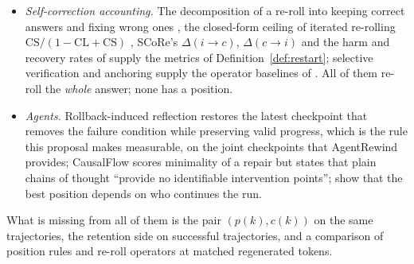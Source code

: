 \begin{itemize}[leftmargin=1.1em]
\item \emph{Self-correction accounting.} The decomposition of a re-roll into keeping correct answers and fixing wrong ones \cite{yang2024confcrit,huang2024cannot,kamoi2024survey}, the closed-form ceiling of iterated re-rolling $\mathrm{CS}/(1-\mathrm{CL}+\mathrm{CS})$ \cite{yang2025scaling}, SCoRe's $\Delta(i{\to}c)$, $\Delta(c{\to}i)$ \cite{kumar2025score} and the harm and recovery rates of \citet{zhang2026riskaware} supply the metrics of Definition~\ref{def:restart}; selective verification \cite{dip2026thinkagain} and anchoring \cite{verma2026tryagain} supply the operator baselines of . All of them re-roll the \emph{whole} answer; none has a position.
\item \emph{Agents.} Rollback-induced reflection \cite{yu2026rir} restores the latest checkpoint that removes the failure condition while preserving valid progress, which is the rule this proposal makes measurable, on the joint checkpoints that AgentRewind \cite{zhuang2026agentrewind} provides; CausalFlow \cite{bonagiri2026causalflow} scores minimality of a repair but states that plain chains of thought ``provide no identifiable intervention points''; \citet{liao2026repairs} show that the best position depends on who continues the run.
\end{itemize}
What is missing from all of them is the pair $(p(k),c(k))$ on the same trajectories, the retention side on successful trajectories, and a comparison of position rules and re-roll operators at matched regenerated tokens.

